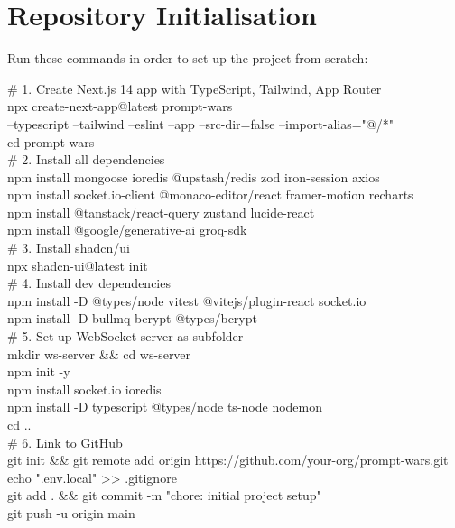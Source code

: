 \documentclass[11pt, a4paper]{article}
\begin{document}
\section{Repository Initialisation}

Run these commands in order to set up the project from scratch:

\begin{tcolorbox}[codebox]
\small\color{white}\ttfamily
\textcolor{codegreen}{\# 1. Create Next.js 14 app with TypeScript, Tailwind, App Router}\\
npx create-next-app@latest prompt-wars \\
\quad\quad --typescript --tailwind --eslint --app --src-dir=false --import-alias="@/*"\\[0.2em]
cd prompt-wars\\[0.2em]
\textcolor{codegreen}{\# 2. Install all dependencies}\\
npm install mongoose ioredis @upstash/redis zod iron-session axios\\
npm install socket.io-client @monaco-editor/react framer-motion recharts\\
npm install @tanstack/react-query zustand lucide-react\\
npm install @google/generative-ai groq-sdk\\[0.2em]
\textcolor{codegreen}{\# 3. Install shadcn/ui}\\
npx shadcn-ui@latest init\\[0.2em]
\textcolor{codegreen}{\# 4. Install dev dependencies}\\
npm install -D @types/node vitest @vitejs/plugin-react socket.io\\
npm install -D bullmq bcrypt @types/bcrypt\\[0.2em]
\textcolor{codegreen}{\# 5. Set up WebSocket server as subfolder}\\
mkdir ws-server \&\& cd ws-server\\
npm init -y\\
npm install socket.io ioredis\\
npm install -D typescript @types/node ts-node nodemon\\
cd ..\\[0.2em]
\textcolor{codegreen}{\# 6. Link to GitHub}\\
git init \&\& git remote add origin https://github.com/your-org/prompt-wars.git\\
echo ".env.local" >> .gitignore\\
git add . \&\& git commit -m "chore: initial project setup"\\
git push -u origin main
\end{tcolorbox}
\end{document}
